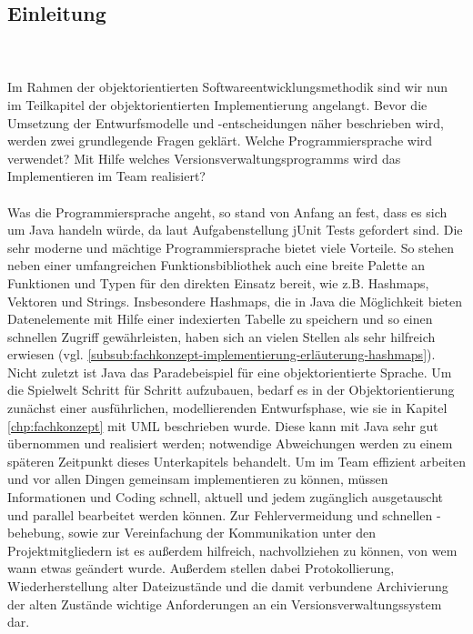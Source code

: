 \subsection{Einleitung}
\label{sub:fachkonzept-implementierung-einleitung}

\\
\\
Im Rahmen der objektorientierten Softwareentwicklungsmethodik sind wir nun im Teilkapitel der objektorientierten Implementierung angelangt. Bevor die Umsetzung der Entwurfsmodelle und -entscheidungen näher beschrieben wird, werden zwei grundlegende Fragen geklärt. Welche Programmiersprache wird verwendet? Mit Hilfe welches Versionsverwaltungsprogramms wird das Implementieren im Team realisiert?
\\
\\
Was die Programmiersprache angeht, so stand von Anfang an fest, dass es sich um Java handeln würde, da laut Aufgabenstellung jUnit Tests gefordert sind. Die sehr moderne und mächtige Programmiersprache bietet viele Vorteile. So stehen neben einer umfangreichen Funktionsbibliothek auch eine breite Palette an Funktionen und Typen für den direkten Einsatz bereit, wie z.B. Hashmaps, Vektoren und Strings. Insbesondere Hashmaps, die in Java die Möglichkeit bieten Datenelemente mit Hilfe einer indexierten Tabelle zu speichern und so einen schnellen Zugriff gewährleisten, haben sich an vielen Stellen als sehr hilfreich erwiesen (vgl. \ref{subsub:fachkonzept-implementierung-erläuterung-hashmaps}). 
\\
Nicht zuletzt ist Java das Paradebeispiel für eine objektorientierte Sprache. Um die Spielwelt Schritt für Schritt aufzubauen, bedarf es in der Objektorientierung zunächst einer ausführlichen, modellierenden Entwurfsphase, wie sie in Kapitel \ref{chp:fachkonzept} mit UML beschrieben wurde. Diese kann mit Java sehr gut übernommen und realisiert werden; notwendige Abweichungen werden zu einem späteren Zeitpunkt dieses Unterkapitels behandelt. 
Um im Team effizient arbeiten und vor allen Dingen gemeinsam implementieren zu können, müssen Informationen und Coding schnell, aktuell und jedem zugänglich ausgetauscht und parallel bearbeitet werden können. Zur Fehlervermeidung und schnellen -behebung, sowie zur Vereinfachung der Kommunikation unter den Projektmitgliedern ist es außerdem hilfreich, nachvollziehen zu können, von wem wann etwas geändert wurde. Außerdem stellen dabei Protokollierung, Wiederherstellung alter Dateizustände und die damit verbundene Archivierung der alten Zustände wichtige Anforderungen an ein Versionsverwaltungssystem dar. 
